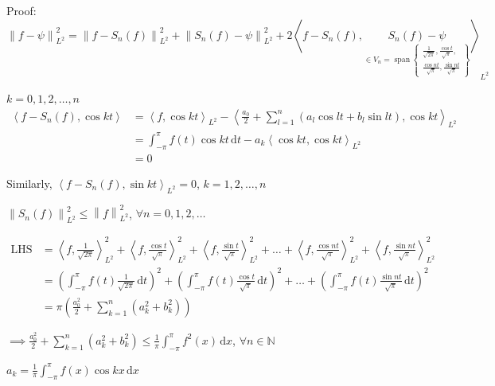 Proof: $\left\|f-\psi\right\|_{L^2}^2=\left\|f-S_n(f)\right\|_{L^2}^2+\left\|S_n(f)-\psi\right\|_{L^2}^2+2\left<f-S_n(f),\underset{\in V_n=\operatorname{span}\left\{\substack{\frac{1}{\sqrt{2\pi}},\frac{\cos t}{\sqrt{\pi}},\\\frac{\cos nt}{\sqrt{\pi}},\frac{\sin nt}{\sqrt{\pi}}}\right\}}{S_n(f)-\psi}\right>_{L^2}$

$k=0,1,2,\dots,n$
\begin{align*}
    \left<f-S_n(f),\cos kt\right>
     & =\left<f,\cos kt\right>_{L^2}-\left<\frac{a_0}{2}+\sum_{l=1}^n\left(a_l\cos lt+b_l\sin lt\right),\cos kt\right>_{L^2} \\
     & =\int_{-\pi}^{\pi}f(t)\cos kt\,\mathrm{d}t-a_k\left<\cos kt,\cos kt\right>_{L^2}                                      \\
     & =0
\end{align*}

Similarly, $\left<f-S_n(f),\sin kt\right>_{L^2}=0$, $k=1,2,\dots,n$

$\left\|S_n(f)\right\|_{L^2}^2\leq\left\|f\right\|_{L^2}^2$, $\forall n=0,1,2,\dots$

\begin{align*}
    \text{LHS}
     & =\left<f,\frac{1}{\sqrt{2\pi}}\right>_{L^2}^2+\left<f,\frac{\cos t}{\sqrt{\pi}}\right>_{L^2}^2+\left<f,\frac{\sin t}{\sqrt{\pi}}\right>_{L^2}^2+\dots+\left<f,\frac{\cos nt}{\sqrt{\pi}}\right>_{L^2}^2+\left<f,\frac{\sin nt}{\sqrt{\pi}}\right>_{L^2}^2 \\
     & =\left(\int_{-\pi}^{\pi}f(t)\frac{1}{\sqrt{2\pi}}\,\mathrm{d}t\right)^2+\left(\int_{-\pi}^{\pi}f(t)\frac{\cos t}{\sqrt{\pi}}\,\mathrm{d}t\right)^2+\dots+\left(\int_{-\pi}^{\pi}f(t)\frac{\sin nt}{\sqrt{\pi}}\,\mathrm{d}t\right)^2                      \\
     & =\pi\left(\frac{a_0^2}{2}+\sum_{k=1}^n\left(a_k^2+b_k^2\right)\right)
\end{align*}

$\implies\frac{a_0^2}{2}+\sum_{k=1}^n\left(a_k^2+b_k^2\right)\leq\frac{1}{\pi}\int_{-\pi}^{\pi}f^2(x)\,\mathrm{d}x$, $\forall n\in\mathbb{N}$

$a_k=\frac{1}{\pi}\int_{-\pi}^{\pi}f(x)\cos kx\,\mathrm{d}x$